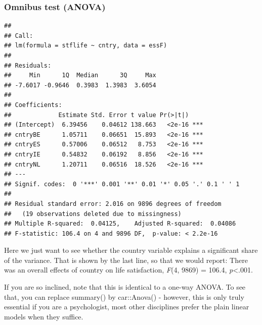 \documentclass[
]{book}
\newenvironment{Shaded}{\begin{snugshade}}{\end{snugshade}}
\newcommand{\CommentTok}[1]{\textcolor[rgb]{0.56,0.35,0.01}{\textit{#1}}}
\newcommand{\DataTypeTok}[1]{\textcolor[rgb]{0.13,0.29,0.53}{#1}}
\newcommand{\KeywordTok}[1]{\textcolor[rgb]{0.13,0.29,0.53}{\textbf{#1}}}
\newcommand{\NormalTok}[1]{#1}
\newcommand{\OperatorTok}[1]{\textcolor[rgb]{0.81,0.36,0.00}{\textbf{#1}}}
\newcommand{\StringTok}[1]{\textcolor[rgb]{0.31,0.60,0.02}{#1}}
\begin{document}
\hypertarget{omnibus-test-anova}{%
\subsubsection{Omnibus test (ANOVA)}\label{omnibus-test-anova}}

\begin{Shaded}
\end{Shaded}

\begin{verbatim}
## 
## Call:
## lm(formula = stflife ~ cntry, data = essF)
## 
## Residuals:
##     Min      1Q  Median      3Q     Max 
## -7.6017 -0.9646  0.3983  1.3983  3.6054 
## 
## Coefficients:
##             Estimate Std. Error t value Pr(>|t|)    
## (Intercept)  6.39456    0.04612 138.663   <2e-16 ***
## cntryBE      1.05711    0.06651  15.893   <2e-16 ***
## cntryES      0.57006    0.06512   8.753   <2e-16 ***
## cntryIE      0.54832    0.06192   8.856   <2e-16 ***
## cntryNL      1.20711    0.06516  18.526   <2e-16 ***
## ---
## Signif. codes:  0 '***' 0.001 '**' 0.01 '*' 0.05 '.' 0.1 ' ' 1
## 
## Residual standard error: 2.016 on 9896 degrees of freedom
##   (19 observations deleted due to missingness)
## Multiple R-squared:  0.04125,	Adjusted R-squared:  0.04086 
## F-statistic: 106.4 on 4 and 9896 DF,  p-value: < 2.2e-16
\end{verbatim}

Here we just want to see whether the country variable explains a significant share of the variance. That is shown by the last line, so that we would report: There was an overall effects of country on life satisfaction, \emph{F}(4, 9869) = 106.4, \emph{p}\textless.001.

If you are so inclined, note that this is identical to a one-way ANOVA. To see that, you can replace summary() by car::Anova() - however, this is only truly essential if you are a psychologist, most other disciplines prefer the plain linear models when they suffice.
\end{document}
